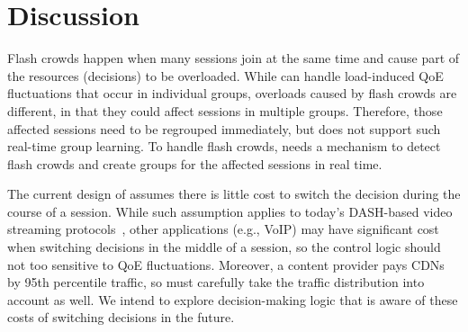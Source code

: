 \section{Discussion}
\label{sec:pytheas:discuss}

Flash crowds happen when many sessions join at the same time and cause part of the resources (decisions) to be overloaded.
While \name can handle load-induced QoE fluctuations that occur in individual groups, overloads caused by flash crowds are different, in that they could affect sessions in multiple groups. Therefore, those affected sessions need to be regrouped immediately, but \name does not support such real-time group learning. 
To handle flash crowds, \name needs a mechanism to detect flash crowds and create groups for the affected sessions in real time.



The current design of \name assumes there is little cost to switch the decision during the course of a session. 
While such assumption applies to today's DASH-based video streaming protocols~\cite{dash-standard}, other applications (e.g., VoIP) may have significant cost when switching decisions in the middle of a session, so the control logic should not too sensitive to QoE fluctuations.
Moreover, a content provider pays CDNs by 95th percentile traffic, so \name must carefully take the traffic distribution into account as well.
We intend to explore decision-making logic that is aware of these costs of switching decisions in the future.


